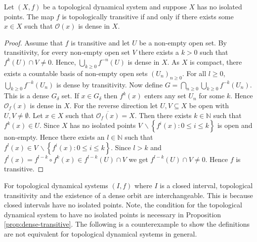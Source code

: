 \begin{prop} \label{prop:dense-transitive}
    Let $(X, f)$ be a topological dynamical system and suppose $X$ has no isolated points. The map $f$ is topologically transitive if and only if there exists some $x \in X$ such that $\mathcal{O}(x)$ is dense in $X$.
    \begin{proof}
        Assume that $f$ is transitive and let $U$ be a non-empty open set. By transitivity, for every non-empty open set $V$ there exists a $k > 0$ such that $f^k(U) \cap V \neq 0$. Hence, $\bigcup_{k \geq 0}f^{-n}(U)$ is dense in $X$. As $X$ is compact, there exists a countable basis of non-empty open sets $(U_n)_{n \geq 0}$. For all $l \geq 0$, $\bigcup_{k \geq 0}f^{-k}(U_n)$ is dense by transitivity. Now define $G = \bigcap_{n \geq 0}\bigcup_{k \geq 0}f^{-k}(U_n)$. This is a dense $G_\delta$ set. If $x \in G_\delta$ then $f^k(x)$ enters any set $U_n$ for some $k$. Hence $\mathcal{O}_f(x)$ is dense in $X$. For the reverse direction let $U, V \subseteq X$ be open with $U, V \neq \emptyset$. Let $x \in X$ such that $\overline{\mathcal{O}_f(x)} = X$. Then there exists $k \in \mathbb{N}$ such that $f^k(x) \in U$. Since $X$ has no isolated points $V\, \backslash \left\lbrace f^i(x) : 0 \leq i \leq k \right\rbrace$ is open and non-empty. Hence there exists an $l \in \mathbb{N}$ such that $f^l(x) \in V\, \backslash \left\lbrace f^i(x) : 0 \leq i \leq k \right\rbrace$. Since $l > k$ and $f^l(x) = f^{l - k} \circ f^{k}(x) \in f^{l - k}(U) \cap V$ we get $f^{l - k}(U) \cap V \neq 0$. Hence $f$ is transitive.
    \end{proof}
\end{prop}

For topological dynamical systems $(I, f)$ where $I$ is a closed interval, topological transitivity and the existence of a dense orbit are interchangeable. This is because closed intervals have no isolated points. Note, the condition for the topological dynamical system to have no isolated points is necessary in Proposition \ref{prop:dense-transitive}. The following is a counterexample to show the definitions are not equivalent for topological dynamical systems in general.

